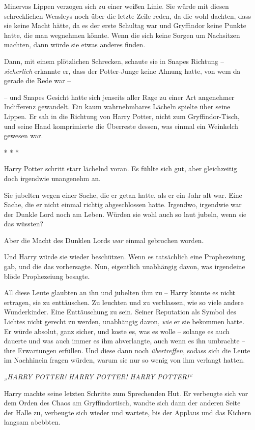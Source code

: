 {Minervas Lippen verzogen sich zu einer weißen Linie. Sie würde mit diesen schrecklichen Weasleys noch über die letzte Zeile reden, da die wohl dachten, dass sie keine Macht hätte, da es der erste Schultag war und Gryffindor keine Punkte hatte, die man wegnehmen könnte. Wenn die sich keine Sorgen um Nachsitzen machten, dann würde sie etwas anderes finden.

Dann, mit einem plötzlichen Schrecken, schaute sie in Snapes Richtung -- \emph{sicherlich} erkannte er, dass der Potter-Junge keine Ahnung hatte, von wem da gerade die Rede war --

-- und Snapes Gesicht hatte sich jenseits aller Rage zu einer Art angenehmer Indifferenz gewandelt. Ein kaum wahrnehmbares Lächeln spielte über seine Lippen. Er sah in die Richtung von Harry Potter, nicht zum Gryffindor-Tisch, und seine Hand komprimierte die Überreste dessen, was einmal ein Weinkelch gewesen war.

* * *

Harry Potter schritt starr lächelnd voran. Es fühlte sich gut, aber gleichzeitig doch irgendwie unangenehm an.

Sie jubelten wegen einer Sache, die er getan hatte, als er ein Jahr alt war. Eine Sache, die er nicht einmal richtig abgeschlossen hatte. Irgendwo, irgendwie war der Dunkle Lord noch am Leben. Würden sie wohl auch so laut jubeln, wenn sie das wüssten?

Aber die Macht des Dunklen Lords \emph{war} einmal gebrochen worden.

Und Harry würde sie wieder beschützen. Wenn es tatsächlich eine Prophezeiung gab, und die das vorhersagte. Nun, eigentlich unabhängig davon, was irgendeine blöde Prophezeiung besagte.

All diese Leute glaubten an ihn und jubelten ihm zu -- Harry könnte es nicht ertragen, sie zu enttäuschen. Zu leuchten und zu verblassen, wie so viele andere Wunderkinder. Eine Enttäuschung zu sein. Seiner Reputation als Symbol des Lichtes nicht gerecht zu werden, unabhängig davon, \emph{wie} er sie bekommen hatte. Er würde absolut, ganz sicher, und koste es, was es wolle -- solange es auch dauerte und was auch immer es ihm abverlangte, auch wenn es ihn umbrachte -- ihre Erwartungen erfüllen. Und diese dann noch \emph{übertreffen}, sodass sich die Leute im Nachhinein fragen würden, warum sie nur so wenig von ihm verlangt hatten.

\emph{„HARRY POTTER! HARRY POTTER! HARRY POTTER!“}

Harry machte seine letzten Schritte zum Sprechenden Hut. Er verbeugte sich vor dem Orden des Chaos am Gryffindortisch, wandte sich dann der anderen Seite der Halle zu, verbeugte sich wieder und wartete, bis der Applaus und das Kichern langsam abebbten.

}
